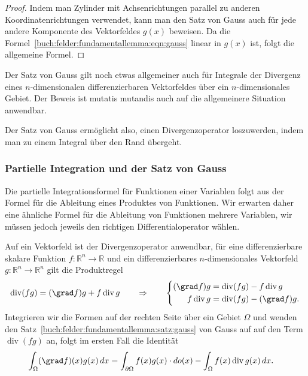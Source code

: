 \begin{proof}
Indem man Zylinder mit Achsenrichtungen parallel zu anderen
Koordinatenrichtungen verwendet, kann man den Satz von Gauss auch für
jede andere Komponente des Vektorfeldes $g(x)$ beweisen.
Da die Formel~\eqref{buch:felder:fundamentallemma:eqn:gauss} 
linear in $g(x)$ ist, folgt die allgemeine Formel.
\end{proof}

Der Satz von Gauss gilt noch etwas allgemeiner auch für Integrale der
Divergenz eines $n$-dimensionalen differenzierbaren Vektorfeldes über
ein $n$-dimensionales Gebiet.
Der Beweis ist mutatis mutandis auch auf die allgemeinere Situation
anwendbar.

Der Satz von Gauss ermöglicht also, einen Divergenzoperator loszuwerden,
indem man zu einem Integral über den Rand übergeht.

%
%
\subsubsection{Partielle Integration und der Satz von Gauss}
Die partielle Integrationsformel für Funktionen einer Variablen folgt aus
der Formel für die Ableitung eines Produktes von Funktionen.
Wir erwarten daher eine ähnliche Formel für die Ableitung von
Funktionen mehrere Variablen, wir müssen jedoch jeweils den richtigen
Differentialoperator wählen.

Auf ein Vektorfeld ist der Divergenzoperator anwendbar, für eine
differenzierbare skalare Funktion $f\colon\mathbb{R}^n\to\mathbb{R}$
und ein differenzierbares $n$-dimensionales Vektorfeld
$g\colon\mathbb{R}^n\to\mathbb{R}^n$ gilt die Produktregel
\[
\operatorname{div}(fg)
=
(\grad f)g
+
f\operatorname{div}g
\qquad\Rightarrow\qquad
\left\{
\begin{aligned}
(\grad f)g &= \operatorname{div}(fg) - f\operatorname{div}g \\
f\operatorname{div}g &= \operatorname{div}(fg) - (\grad f)g.
\end{aligned}
\right.
\]
Integrieren wir die Formen auf der rechten Seite über ein Gebiet $\Omega$
und wenden den Satz~\ref{buch:felder:fundamentallemma:satz:gauss}
von Gauss auf auf den Term $\operatorname{div}(fg)$ an, folgt im
ersten Fall die Identität
\begin{align*}
\int_{\Omega} (\grad f)(x) g(x)\,dx
&=
\int_{\partial\Omega} f(x)g(x)\cdot do(x)
-
\int_{\Omega} f(x)\operatorname{div}g(x)\,dx.
\end{align*}

